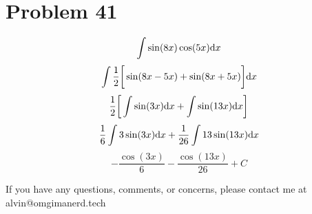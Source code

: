 \documentclass[letterpaper, 12pt]{math}
\begin{document}
\section*{Problem 41}
\[ \int{\sin(8x)\cos(5x)\mathrm{d}{x}} \]
\[ \int{\frac{1}{2}\bigg[\sin(8x-5x)+\sin(8x+5x)\bigg]\mathrm{d}{x}} \]
\[ \frac{1}{2}\bigg[\int{\sin(3x)\mathrm{d}{x}}+\int{\sin(13x)\mathrm{d}{x}}\bigg] \]
\[ \frac{1}{6}\int{3\sin(3x)\mathrm{d}{x}}+\frac{1}{26}\int{13\sin(13x)\mathrm{d}{x}} \]
\[ -\frac{\cos(3x)}{6}-\frac{\cos(13x)}{26}+C \]

\begin{center}
  If you have any questions, comments, or concerns, please contact me at
  alvin@omgimanerd.tech
\end{center}
\end{document}
